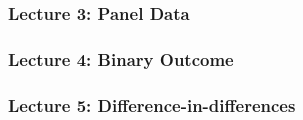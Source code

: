 \documentclass[
]{article}
\begin{document}
\subsubsection{Lecture 3: Panel Data}\label{lecture-3-panel-data}

\subsubsection{Lecture 4: Binary
Outcome}\label{lecture-4-binary-outcome}

\subsubsection{Lecture 5:
Difference-in-differences}\label{lecture-5-difference-in-differences}
\end{document}
